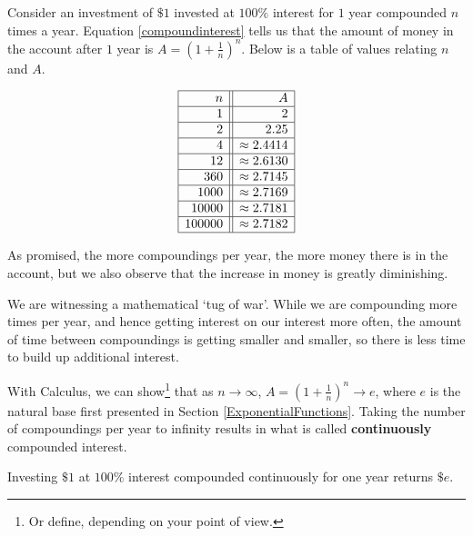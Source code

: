 \smallskip

Consider an investment of $\$ 1$ invested at $100 \%$ interest for $1$ year compounded $n$ times a year.  Equation \ref{compoundinterest} tells us that the amount of money in the account after $1$ year is $A = \left(1+\frac{1}{n}\right)^{n}$.  Below is a table of values relating $n$ and $A$.

\[ \begin{array}{|r||r|}  

\hline

 n & A   \\ \hline
1  & 2  \\  \hline
2  & 2.25  \\  \hline
4 & \approx 2.4414  \\  \hline
12 & \approx 2.6130  \\  \hline
360  & \approx  2.7145 \\  \hline
1000  & \approx 2.7169 \\  \hline
10000  & \approx 2.7181  \\  \hline
100000 & \approx 2.7182  \\  \hline
\end{array} \]

As promised, the more compoundings per year, the more money there is in the account, but we also observe that the increase in money is greatly diminishing.  

\smallskip

We are witnessing a mathematical `tug of war'.  While we are compounding more times per year, and hence getting interest on our interest more often, the amount of time between compoundings is getting smaller and smaller, so there is less time to build up additional interest. 

\smallskip

With Calculus, we can show\footnote{Or define, depending on your point of view.} that as $n \rightarrow \infty$, $A = \left(1+\frac{1}{n}\right)^{n} \rightarrow e$, where $e$ is the natural base first presented in Section \ref{ExponentialFunctions}.  Taking the number of compoundings per year to infinity results in what is called  \textbf{continuously} compounded interest.  

\smallskip

\colorbox{ResultColor}{\bbm

\begin{thm} \label{whatise} Investing $\$1$ at $100 \%$ interest compounded continuously for one year returns $\$ e$. 

\end{thm}

\ebm}

